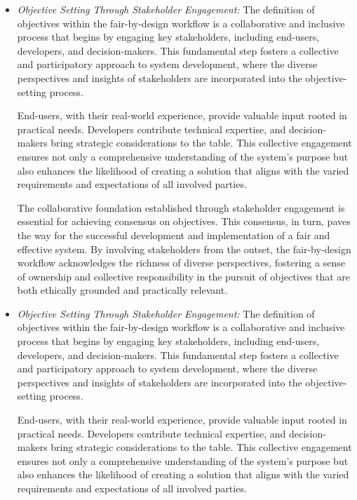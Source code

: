 \begin{itemize}

    \item \emph{Objective Setting Through Stakeholder Engagement:} The definition of objectives within the fair-by-design workflow is a collaborative and inclusive process that begins by engaging key stakeholders, including end-users, developers, and decision-makers. This fundamental step fosters a collective and participatory approach to system development, where the diverse perspectives and insights of stakeholders are incorporated into the objective-setting process.

    End-users, with their real-world experience, provide valuable input rooted in practical needs. Developers contribute technical expertise, and decision-makers bring strategic considerations to the table. This collective engagement ensures not only a comprehensive understanding of the system's purpose but also enhances the likelihood of creating a solution that aligns with the varied requirements and expectations of all involved parties.

    The collaborative foundation established through stakeholder engagement is essential for achieving consensus on objectives. This consensus, in turn, paves the way for the successful development and implementation of a fair and effective system. By involving stakeholders from the outset, the fair-by-design workflow acknowledges the richness of diverse perspectives, fostering a sense of ownership and collective responsibility in the pursuit of objectives that are both ethically grounded and practically relevant.\item \emph{Objective Setting Through Stakeholder Engagement:} The definition of objectives within the fair-by-design workflow is a collaborative and inclusive process that begins by engaging key stakeholders, including end-users, developers, and decision-makers. This fundamental step fosters a collective and participatory approach to system development, where the diverse perspectives and insights of stakeholders are incorporated into the objective-setting process.

    End-users, with their real-world experience, provide valuable input rooted in practical needs. Developers contribute technical expertise, and decision-makers bring strategic considerations to the table. This collective engagement ensures not only a comprehensive understanding of the system's purpose but also enhances the likelihood of creating a solution that aligns with the varied requirements and expectations of all involved parties.


\end{itemize}
